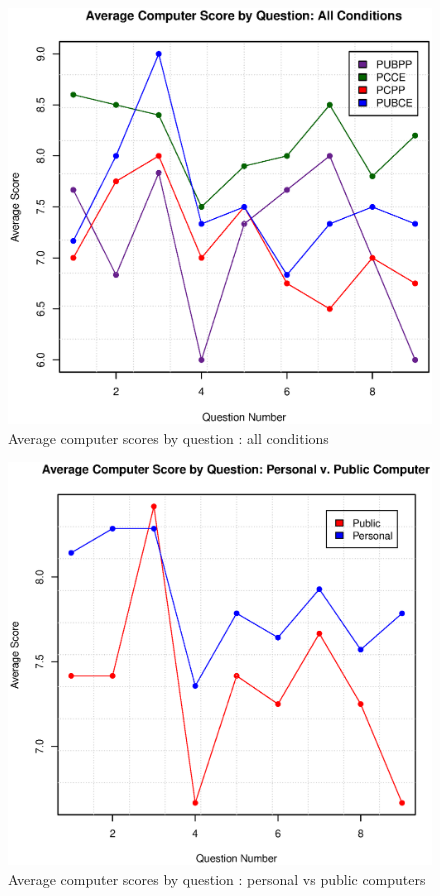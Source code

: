 \documentclass{sig-alternate-05-2015}
\begin{document}
\begin{figure}[h]
\includegraphics[width=\columnwidth]{FourCondtionAverageScores}
\centering
\caption{Average computer scores by question : all conditions}
\label{fig:fourCondAvg}
\end{figure}

\begin{figure}[h]
\includegraphics[width=\columnwidth]{ScorebyQuestion_persVpub}
\centering
\caption{Average computer scores by question : personal vs public computers}
\label{fig:pervpub}
\end{figure}
\end{document}
